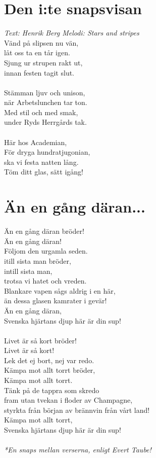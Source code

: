 \section{Den i:te snapsvisan}
\textit{Text: Henrik Berg \hspace{5mm} Melodi: Stars and stripes}
\vspace{2mm}\\
Vänd på slipsen nu vän,\\
låt oss ta en tår igen.\\
Sjung ur strupen rakt ut,\\
innan festen tagit slut.\\
\\
Stämman ljuv och unison,\\
när Arbetslunchen tar ton.\\
Med stil och med smak,\\
under Ryds Herrgårds tak.\\
\\
Här hos Academian,\\
För dryga hundratjugonian,\\
ska vi festa natten lång.\\
Töm ditt glas, sätt igång!\\

\section{Än en gång däran...}
Än en gång däran bröder!\\
Än en gång däran!\\
Följom den urgamla seden.\\
itill sista man bröder,\\
intill sista man,\\
trotsa vi hatet och vreden.\\
Blankare vapen sågs aldrig i en här,\\
än dessa glasen kamrater i gevär!\\
Än en gång däran,\\
Svenska hjärtans djup här är din sup!\\
\*\\
Livet är så kort bröder!\\
Livet är så kort!\\
Lek det ej bort, nej var redo.\\
Kämpa mot allt torrt bröder,\\
Kämpa mot allt torrt.\\
Tänk på de tappra som skredo\\
fram utan tvekan i floder av Champagne,\\
styrkta från början av brännvin från vårt land!\\
Kämpa mot allt torrt,\\
Svenska hjärtans djup här är din sup!\\
\vspace{\fill}
\\
\textit{*En snaps mellan verserna, enligt Evert Taube!}
